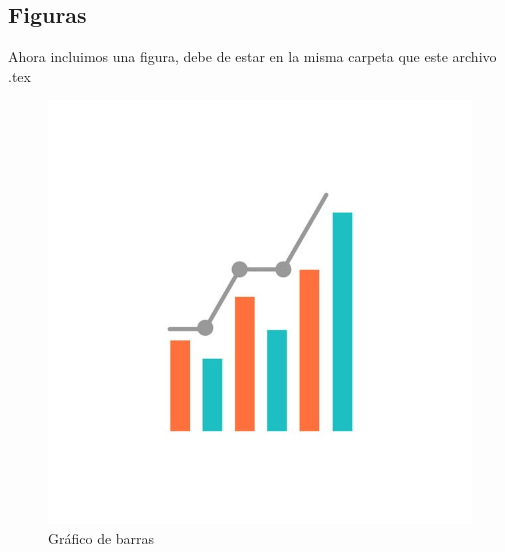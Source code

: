 \subsection{Figuras}            
Ahora incluimos una figura, debe de estar en la misma carpeta que este archivo .tex

\begin{figure}[h!]
	\centering
	\includegraphics[width=0.5\linewidth]{grafica1}
	\caption{Gráfico de barras}
\end{figure}

\carath*